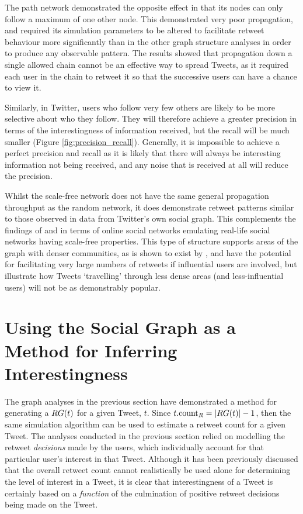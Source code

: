 The path network demonstrated the opposite effect in that its nodes can only follow a maximum of one other node. This demonstrated very poor propagation, and required its simulation parameters to be altered to facilitate retweet behaviour more significantly than in the other graph structure analyses in order to produce any observable pattern. The results showed that propagation down a single allowed chain cannot be an effective way to spread Tweets, as it required each user in the chain to retweet it so that the successive users can have a chance to view it.

Similarly, in Twitter, users who follow very few others are likely to be more selective about who they follow. They will therefore achieve a greater precision in terms of the interestingness of information received, but the recall will be much smaller (Figure \ref{fig:precision_recall}). Generally, it is impossible to achieve a perfect precision and recall as it is likely that there will always be interesting information not being received, and any noise that is received at all will reduce the precision.

Whilst the scale-free network does not have the same general propagation throughput as the random network, it does demonstrate retweet patterns similar to those observed in data from Twitter's own social graph. This complements the findings of \cite{mislove07} and \cite{hein06} in terms of online social networks emulating real-life social networks having scale-free properties. This type of structure supports areas of the graph with denser communities, as is shown to exist by \cite{java07}, and have the potential for facilitating very large numbers of retweets if influential users are involved, but illustrate how Tweets `travelling' through less dense areas (and less-influential users) will not be as demonstrably popular.



\section{Using the Social Graph as a Method for Inferring Interestingness}
The graph analyses in the previous section have demonstrated a method for generating a $RG(t)$ for a given Tweet, $t$. Since $t.\textrm{count}_R = |RG(t)| - 1$, then the same simulation algorithm can be used to estimate a retweet count for a given Tweet. The analyses conducted in the previous section relied on modelling the retweet \textit{decisions} made by the users, which individually account for that particular user's interest in that Tweet. Although it has been previously discussed that the overall retweet count cannot realistically be used alone for determining the level of interest in a Tweet, it is clear that interestingness of a Tweet is certainly based on a \textit{function} of the culmination of positive retweet decisions being made on the Tweet.

